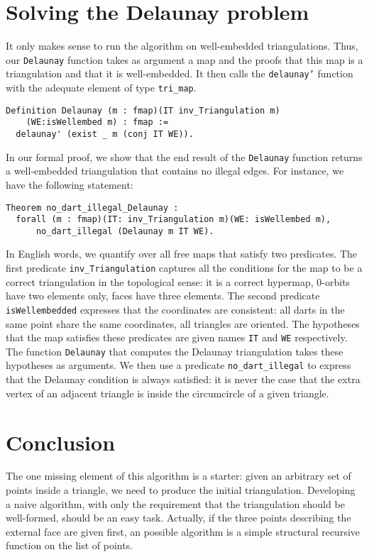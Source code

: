 \documentclass{llncs}
\begin{document}
\section{Solving the Delaunay problem} 
\label{DS}
It only makes sense to run the algorithm on well-embedded triangulations.
Thus, our {\tt Delaunay} function takes as argument a map and the proofs
that this map is a triangulation and that it is well-embedded.  It then calls
the {\tt delaunay'} function with the adequate element of type {\tt tri\_map}.
\begin{verbatim}
Definition Delaunay (m : fmap)(IT inv_Triangulation m)
    (WE:isWellembed m) : fmap :=
  delaunay' (exist _ m (conj IT WE)).
\end{verbatim}

In our formal proof, we show that the end result of the {\tt Delaunay}
function returns a well-embedded triangulation that contains no illegal
edges.  For instance, we have the following statement:

\begin{verbatim}
Theorem no_dart_illegal_Delaunay : 
  forall (m : fmap)(IT: inv_Triangulation m)(WE: isWellembed m),  
      no_dart_illegal (Delaunay m IT WE). 
\end{verbatim}
In English words, we quantify over all free maps that satisfy two
predicates.  The first predicate {\tt inv\_Triangulation} captures all
the conditions for the map to be a correct triangulation in the
topological sense: it is a correct hypermap, 0-orbits have two
elements only, faces have three elements.  The second predicate
{\tt isWellembedded}
expresses that the coordinates are consistent: all darts in the same point
share the same coordinates, all triangles are oriented.  The hypotheses
that the map satisfies these predicates are given names {\tt IT} and {\tt WE}
respectively.  The function {\tt Delaunay}
that computes the Delaunay triangulation takes
these hypotheses as arguments.  We then use a predicate {\tt no\_dart\_illegal}
to express that the Delaunay condition is always satisfied: it is never the
case that the extra vertex of an adjacent triangle is inside the circumcircle
of a given triangle.

\section{Conclusion}
\label{CL}
The one missing element of this algorithm is a starter: given an arbitrary set
of points inside a triangle, we need to produce the initial triangulation.
Developing a naive algorithm, with only the requirement that the triangulation
should be well-formed, should be an easy task.  Actually, if the three points
describing the external face are given first, an possible algorithm is
a simple structural recursive function on the list of points.
\end{document}
